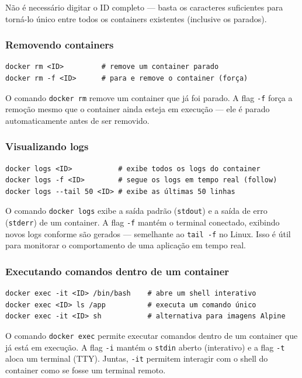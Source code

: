 Não é necessário digitar o ID completo --- basta os caracteres suficientes para torná-lo único entre todos os containers existentes (inclusive os parados).

\subsubsection{Removendo containers}

\begin{verbatim}
docker rm <ID>         # remove um container parado
docker rm -f <ID>      # para e remove o container (força)
\end{verbatim}

O comando \texttt{docker rm} remove um container que já foi parado. A flag \texttt{-f} força a remoção mesmo que o container ainda esteja em execução --- ele é parado automaticamente antes de ser removido.

\subsubsection{Visualizando logs}

\begin{verbatim}
docker logs <ID>           # exibe todos os logs do container
docker logs -f <ID>        # segue os logs em tempo real (follow)
docker logs --tail 50 <ID> # exibe as últimas 50 linhas
\end{verbatim}

O comando \texttt{docker logs} exibe a saída padrão (\texttt{stdout}) e a saída de erro (\texttt{stderr}) de um container. A flag \texttt{-f} mantém o terminal conectado, exibindo novos logs conforme são gerados --- semelhante ao \texttt{tail -f} no Linux. Isso é útil para monitorar o comportamento de uma aplicação em tempo real.

\subsubsection{Executando comandos dentro de um container}

\begin{verbatim}
docker exec -it <ID> /bin/bash    # abre um shell interativo
docker exec <ID> ls /app          # executa um comando único
docker exec -it <ID> sh           # alternativa para imagens Alpine
\end{verbatim}

O comando \texttt{docker exec} permite executar comandos dentro de um container que já está em execução. A flag \texttt{-i} mantém o \texttt{stdin} aberto (interativo) e a flag \texttt{-t} aloca um terminal (TTY). Juntas, \texttt{-it} permitem interagir com o shell do container como se fosse um terminal remoto.


